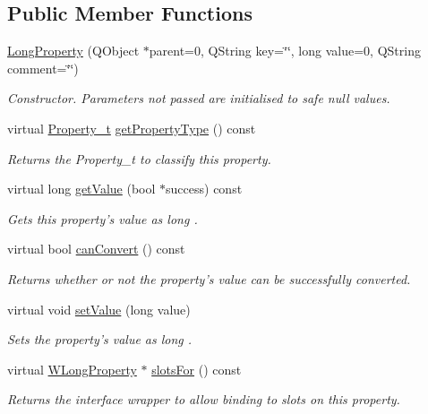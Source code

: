 \subsection*{Public Member Functions}
\begin{DoxyCompactItemize}
\item 
\hyperlink{class_long_property_a9c4b842a60dce4d158af82e74d877492}{Long\-Property} (Q\-Object $\ast$parent=0, Q\-String key=\char`\"{}\char`\"{}, long value=0, Q\-String comment=\char`\"{}\char`\"{})
\begin{DoxyCompactList}\small\item\em Constructor. Parameters not passed are initialised to safe null values. \end{DoxyCompactList}\item 
virtual \hyperlink{group___property_classes_ga38f1ccddda12c7cb50b868c9f789ee37}{Property\-\_\-t} \hyperlink{class_long_property_a896acbfd359960cf26185c278b6ed85a}{get\-Property\-Type} () const 
\begin{DoxyCompactList}\small\item\em Returns the Property\-\_\-t to classify this property. \end{DoxyCompactList}\item 
virtual long \hyperlink{class_long_property_a6340f40f5db6887ecef15842faddbc58}{get\-Value} (bool $\ast$success) const 
\begin{DoxyCompactList}\small\item\em Gets this property's value as long . \end{DoxyCompactList}\item 
virtual bool \hyperlink{class_long_property_a0ae32c7376a8a19ac6ac3010c7143f75}{can\-Convert} () const 
\begin{DoxyCompactList}\small\item\em Returns whether or not the property's value can be successfully converted. \end{DoxyCompactList}\item 
virtual void \hyperlink{class_long_property_ad39da450d5291d57af3216dfc5008c28}{set\-Value} (long value)
\begin{DoxyCompactList}\small\item\em Sets the property's value as long . \end{DoxyCompactList}\item 
virtual \hyperlink{class_w_long_property}{W\-Long\-Property} $\ast$ \hyperlink{class_long_property_a0819c723cc3341f44390bb8e4a88d509}{slots\-For} () const 
\begin{DoxyCompactList}\small\item\em Returns the interface wrapper to allow binding to slots on this property. \end{DoxyCompactList}\end{DoxyCompactItemize}
